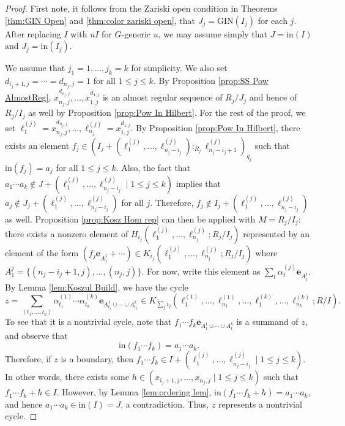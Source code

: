\documentclass[a4paper, 10pt, reqno, english, ones]{amsart}  %
\theoremstyle{definition}
\theoremstyle{remark}
\begin{document}
\AlgMain*
\begin{proof}
    First note, it follows from the Zariski open condition in Theorems \ref{thm:GIN Open} and \ref{thm:color zariski open}, that $J_j=\textrm{GIN}(I_j)$ for each $j$. After replacing $I$ with $uI$ for $G$-generic $u$, we may assume simply that $J=\textrm{in}(I)$ and $J_j=\textrm{in}(I_j)$. 

    We assume that $j_1=1,\dots,j_k = k$ for simplicity. We also set $d_{i_j+1,j}=\cdots =d_{n_j,j}=1$ for all $1\leq j\leq k$. By Proposition \ref{prop:SS Pow AlmostReg}, $x_{n_{j},j}^{d_{n_{j},j}},\dots,x_{1,j}^{d_{1,j}}$ is an almost regular sequence of $R_{j}/J_{j}$ and hence of $R_{j}/I_{j}$ as well by Proposition \ref{prop:Pow In Hilbert}. For the rest of the proof, we set $\ell_1^{(j)} = x_{n_{j},j}^{d_{n_{j},j}},\dots,\ell_{n_{j}}^{(j)} = x_{1,j}^{d_{1,j}}$. By Proposition \ref{prop:Pow In Hilbert}, there exists an element $f_j \in \left(I_{j} + (\ell_1^{(j)},\dots,\ell_{n_{j}-i_j}^{(j)}):_{R_{j}} \ell_{n_{j}-i_j+1}^{(j)}\right)_{q_j}$ such that $\textrm{in}(f_j)=a_j$ for all $1\leq j\leq k$. Also, the fact that $a_1\cdots a_k\notin J+\left(\ell_1^{(j)},\dots,\ell_{n_{j}-i_j}^{(j)} \mid 1\leq j\leq k\right)$ implies that $a_j \notin J_{j}+\left(\ell_1^{(j)},\dots,\ell_{n_{j}-i_j}^{(j)} \right)$ for all $j$. Therefore, $f_j \notin I_{j}+\left(\ell_1^{(j)},\dots,\ell_{n_{j}-i_j}^{(j)} \right)$ as well. Proposition \ref{prop:Kosz Hom rep} can then be applied with $M=R_{j}/I_{j}$: there exists a nonzero element of $H_{i_j}(\ell_1^{(j)},\dots,\ell_{n_{j}}^{(j)};R_{j}/I_{j})$ represented by an element of the form $(f_j\mathbf{e}_{A_1^j}+\cdots)\in K_{i_j}\left(\ell_1^{(j)},\dots,\ell_{n_{j}}^{(j)};R_{j}/I_{j}\right)$ where $A_1^j=\{(n_{j}-i_j+1,j),\dots,(n_{j},j) \}$. For now, write this element as $\sum_t \alpha_t^{(j)}\mathbf{e}_{A_t^j}$. By Lemma \ref{lem:Koszul Build}, we have the cycle 
    \[
    z=\sum_{(t_1,\dots,t_k)}  \alpha_{t_1}^{(1)}\cdots \alpha_{t_k}^{(k)} \mathbf{e}_{A_{t_1}^{1}\cup \cdots \cup A_{t_k}^{k}} \in K_{\sum_ji_j}\left(\ell_1^{(1)},\dots,\ell_{n_{1}}^{(1)},\dots,\ell_1^{(k)},\dots,\ell_{n_{k}}^{(k)}; R/I \right).
    \]
    To see that it is a nontrivial cycle, note that $f_1\cdots f_k \mathbf{e}_{A_1^1\cup \cdots \cup A_1^k}$ is a summand of $z$, and observe that $$\textrm{in}(f_1\cdots f_k) = a_1\cdots a_k.$$ 
    Therefore, if $z$ is a boundary, then $f_1\cdots f_k\in I+\left(\ell_1^{(j)},\dots,\ell_{n_{j}-i_j}^{(j)} \mid 1\leq j\leq k\right)$. In other words, there exists some $h\in \left(x_{i_j+1,j},\dots,x_{n_{j},j} \mid 1\leq j\leq k\right)$ such that $f_1\cdots f_k+h\in I$. However, by Lemma \ref{lem:ordering lem}, $\textrm{in}(f_1\cdots f_k+h)=a_1\cdots a_k$, and hence $a_1\cdots a_k \in \textrm{in}(I)=J$, a contradiction. Thus, $z$ represents a nontrivial cycle.


\end{proof}
\end{document}
